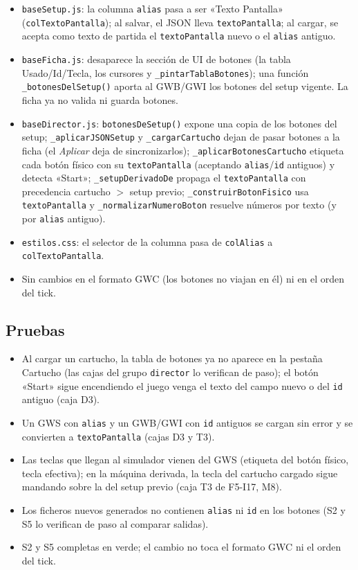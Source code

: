\begin{itemize}
	\item \texttt{baseSetup.js}: la columna \texttt{alias} pasa a ser «Texto Pantalla» (\texttt{colTextoPantalla}); al salvar, el JSON lleva \texttt{textoPantalla}; al cargar, se acepta como texto de partida el \texttt{textoPantalla} nuevo o el \texttt{alias} antiguo.
	\item \texttt{baseFicha.js}: desaparece la sección de UI de botones (la tabla Usado/Id/Tecla, los cursores y \texttt{\_pintarTablaBotones}); una función \texttt{\_botonesDelSetup()} aporta al GWB/GWI los botones del setup vigente. La ficha ya no valida ni guarda botones.
	\item \texttt{baseDirector.js}: \texttt{botonesDeSetup()} expone una copia de los botones del setup; \texttt{\_aplicarJSONSetup} y \texttt{\_cargarCartucho} dejan de pasar botones a la ficha (el \emph{Aplicar} deja de sincronizarlos); \texttt{\_aplicarBotonesCartucho} etiqueta cada botón físico con su \texttt{textoPantalla} (aceptando \texttt{alias}/\texttt{id} antiguos) y detecta «Start»; \texttt{\_setupDerivadoDe} propaga el \texttt{textoPantalla} con precedencia cartucho $>$ setup previo; \texttt{\_construirBotonFisico} usa \texttt{textoPantalla} y \texttt{\_normalizarNumeroBoton} resuelve números por texto (y por \texttt{alias} antiguo).
	\item \texttt{estilos.css}: el selector de la columna pasa de \texttt{colAlias} a \texttt{colTextoPantalla}.
	\item Sin cambios en el formato GWC (los botones no viajan en él) ni en el orden del tick.
\end{itemize}

\subsection{Pruebas}
\label{sec:F5I22Pruebas}

\begin{itemize}
	\item Al cargar un cartucho, la tabla de botones ya no aparece en la pestaña Cartucho (las cajas del grupo \texttt{director} lo verifican de paso); el botón «Start» sigue encendiendo el juego venga el texto del campo nuevo o del \texttt{id} antiguo (caja D3).
	\item Un GWS con \texttt{alias} y un GWB/GWI con \texttt{id} antiguos se cargan sin error y se convierten a \texttt{textoPantalla} (cajas D3 y T3).
	\item Las teclas que llegan al simulador vienen del GWS (etiqueta del botón físico, tecla efectiva); en la máquina derivada, la tecla del cartucho cargado sigue mandando sobre la del setup previo (caja T3 de F5-I17, M8).
	\item Los ficheros nuevos generados no contienen \texttt{alias} ni \texttt{id} en los botones (S2 y S5 lo verifican de paso al comparar salidas).
	\item S2 y S5 completas en verde; el cambio no toca el formato GWC ni el orden del tick.
\end{itemize}

